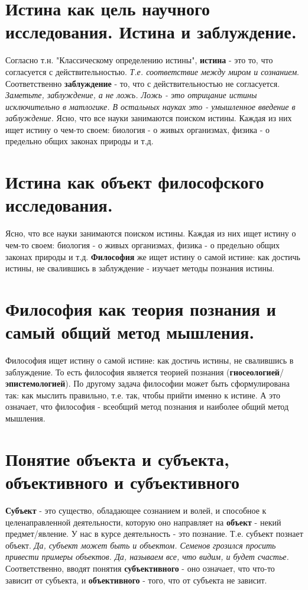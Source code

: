 \section{Истина как цель научного исследования. Истина и заблуждение.}
Согласно т.н. "Классическому определению истины", \textbf{истина} - это то, что согласуется с действительностью. \textit{Т.е. соответствие между миром и сознанием}.
Соответственно \textbf{заблуждение} - то, что с действительностью не согласуется. \textit{Заметьте, заблуждение, а не ложь. Ложь - это отрицание истины исключительно в матлогике. В остальных науках это - умышленное введение в заблуждение.}
Ясно, что все науки занимаются поиском истины.
Каждая из них ищет истину о чем-то своем: биология - о живых организмах, физика - о предельно общих законах природы и т.д.

\section{Истина как объект философского исследования.}
Ясно, что все науки занимаются поиском истины.
Каждая из них ищет истину о чем-то своем: биология - о живых организмах, физика - о предельно общих законах природы и т.д.
\textbf{Философия} же ищет истину о самой истине: как достичь истины, не свалившись в заблуждение - изучает методы познания истины.

\section{Философия как теория познания и самый общий метод мышления.}
Философия ищет истину о самой истине: как достичь истины, не свалившись в заблуждение.
То есть философия является теорией познания (\textbf{гносеологией}/\textbf{эпистемологией}).
По другому задача философии может быть сформулирована так: как мыслить правильно, т.е. так, чтобы прийти именно к истине.
А это означает, что философия - всеобщий метод познания и наиболее общий метод мышления. 

\section{Понятие объекта и субъекта, объективного и субъективного}
\textbf{Субъект} - это существо, обладающее сознанием и волей, и способное к целенаправленной деятельности,
которую оно направляет на \textbf{объект} - некий предмет/явление.
У нас в курсе деятельность - это познание.
Т.е. субъект познает объект.
\textit{Да, субъект может быть и объектом. Семенов грозился просить привести примеры объектов.
Да, называем все, что видим, и будет счастье.} 
Соответственно, вводят понятия \textbf{субъективного} - оно означает, что что-то зависит от субъекта,
и \textbf{объективного} - того, что от субъекта не зависит.

